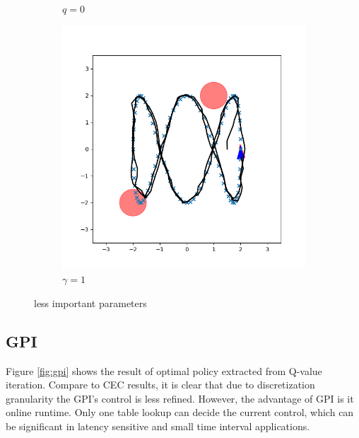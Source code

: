 \documentclass[conference]{IEEEtran}
\begin{document}
\begin{figure}[h]
\begin{subfigure}[b]{0.3\textwidth}
        \caption{$q=0$}
        \label{fig:q0}
    \end{subfigure}
    \hfill
    \begin{subfigure}[b]{0.3\textwidth}
        \includegraphics[width=\textwidth]{../fig/trajectory.cec.gamma_1.png}
        \caption{$\gamma=1$}
        \label{fig:gamma1}
    \end{subfigure}
    \caption{less important parameters}
    \label{fig:p}
\end{figure}

\subsection{GPI}
Figure \ref{fig:gpi} shows the result of optimal policy extracted from Q-value iteration.
Compare to CEC results, it is clear that due to discretization granularity 
the GPI's control is less refined. However, the advantage of GPI is it online runtime.
Only one table lookup can decide the current control, which can be significant in 
latency sensitive and small time interval applications.
\end{document}
